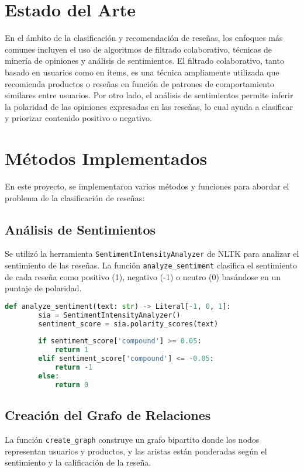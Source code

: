 \documentclass{llncs}
\begin{document}
    \section{Estado del Arte}
    En el ámbito de la clasificación y recomendación de reseñas, los enfoques más comunes incluyen el uso de algoritmos de filtrado colaborativo, técnicas de minería de opiniones y análisis de sentimientos. El filtrado colaborativo, tanto basado en usuarios como en ítems, es una técnica ampliamente utilizada que recomienda productos o reseñas en función de patrones de comportamiento similares entre usuarios. Por otro lado, el análisis de sentimientos permite inferir la polaridad de las opiniones expresadas en las reseñas, lo cual ayuda a clasificar y priorizar contenido positivo o negativo.

    \section{Métodos Implementados}
    En este proyecto, se implementaron varios métodos y funciones para abordar el problema de la clasificación de reseñas:
    
    \subsection{Análisis de Sentimientos}
    Se utilizó la herramienta \texttt{SentimentIntensityAnalyzer} de NLTK para analizar el sentimiento de las reseñas. La función \texttt{analyze\_sentiment} clasifica el sentimiento de cada reseña como positivo (1), negativo (-1) o neutro (0) basándose en un puntaje de polaridad.
    
    \begin{lstlisting}[language=Python, caption=Función de análisis de sentimientos]
    def analyze_sentiment(text: str) -> Literal[-1, 0, 1]:
        sia = SentimentIntensityAnalyzer()
        sentiment_score = sia.polarity_scores(text)
        
        if sentiment_score['compound'] >= 0.05:
            return 1
        elif sentiment_score['compound'] <= -0.05:
            return -1
        else:
            return 0
    \end{lstlisting}
    
    \subsection{Creación del Grafo de Relaciones}
    La función \texttt{create\_graph} construye un grafo bipartito donde los nodos representan usuarios y productos, y las aristas están ponderadas según el sentimiento y la calificación de la reseña.
    
\end{document}
